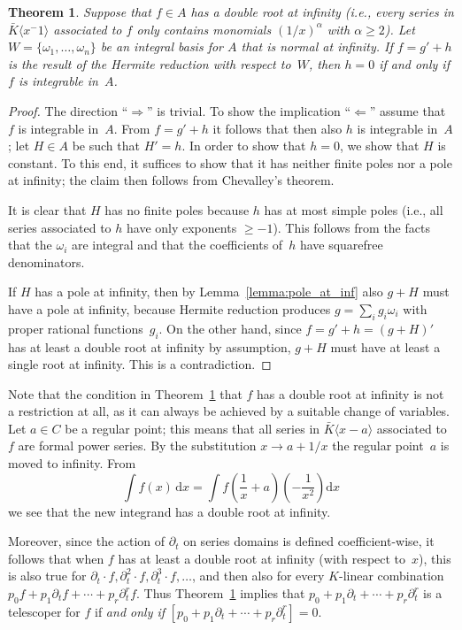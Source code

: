 \documentclass{sig-alternate}
\newtheorem{theorem}{Theorem}
\def\<#1>{\langle#1\rangle}
\begin{document}
\begin{theorem}\label{thm:intiff0}
  Suppose that $f\in A$
  has a double root at infinity (i.e., every series in $\bar K\<x^{-1}>$
  associated to $f$ only contains monomials $(1/x)^\alpha$ with $\alpha\geq2$).
  Let $W=\{\omega_1,\dots,\omega_n\}$
  be an integral basis for $A$ that is normal at infinity.
  If $f=g'+h$ is the result of the Hermite reduction with respect to~$W$,
  then $h=0$ if and only if $f$ is integrable in~$A$.
\end{theorem}

\begin{proof}
The direction ``$\Rightarrow$'' is trivial. To show the implication
``$\Leftarrow$'' assume that $f$ is integrable in~$A$. From $f=g'+h$ it follows that
then also $h$ is integrable in~$A$; let $H\in A$ be such that $H'=h$.  In order to show
that $h=0$, we show that $H$ is constant.  To this end, it suffices to show that
it has neither finite poles nor a pole at infinity; the claim then follows from
Chevalley's theorem.

It is clear that $H$ has no finite poles because $h$ has at most simple poles
(i.e., all series associated to $h$ have only exponents $\geq-1$).
This follows from the facts that the $\omega_i$ are integral and that
the coefficients of~$h$ have squarefree denominators.

If $H$ has a pole at infinity, then by Lemma~\ref{lemma:pole_at_inf} also
$g+H$ must have a pole at infinity, because Hermite reduction produces
$g=\sum_i g_i\omega_i$ with proper rational functions~$g_i$.  On the other
hand, since $f=g'+h=(g+H)'$ has at least a double root at infinity by
assumption, $g+H$ must have at least a single root at infinity. This is
a contradiction.
\end{proof}

Note that the condition in Theorem~\ref{thm:intiff0} that $f$ has a double
root at infinity is not a restriction at all, as it can always be achieved by
a suitable change of variables. Let $a\in C$ be a regular point; this means
that all series in $\bar K\<x-a>$ associated to $f$ are formal power series. By the substitution
$x\to a+1/x$ the regular point~$a$ is moved to infinity. From
\[
  \int f(x) \,\mathrm{d}x = \int f\left(\frac{1}{x}+a\right)\left(-\frac{1}{x^2}\right) \mathrm{d}x
\]
we see that the new integrand has a double root at infinity.

Moreover, since the action of $\partial_t$ on series domains is defined coefficient-wise,
it follows that when $f$ has at least a double root at infinity (with respect to~$x$),
this is also true for $\partial_t\cdot f, \partial_t^2\cdot f, \partial_t^3\cdot f,\dots$,
and then also for every $K$-linear combination $p_0f+p_1\partial_tf+\cdots+p_r\partial_t^rf$.
Thus Theorem~\ref{thm:intiff0} implies that $p_0+p_1\partial_t+\cdots+p_r\partial_t^r$ is a telescoper for $f$ if
\emph{and only if} $[p_0+p_1\partial_t+\cdots+p_r\partial_t^r]=0$.
\end{document}
